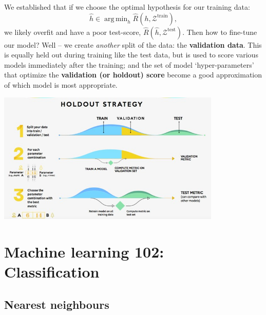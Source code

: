\documentclass{article}
\DeclareMathOperator*{\argmin}{arg\,min}
\begin{document}
\begin{spexample}
    We established that if we choose the optimal hypothesis for our training data:
    \begin{equation}
        \hat{h} \in \argmin_{h}\hat{R}(h,\mathcal{Z}^\text{train}),
    \end{equation}
    we likely overfit and have a poor test-score, $\hat{R}(\hat{h},\mathcal{Z}^\text{test})$. Then how to fine-tune our model? Well -- we create \textit{another} split of the data: the \textbf{validation data}. This is equally held out during training like the test data, but is used to score various models immediately after the training; and the set of model `hyper-parameters' that optimize the \textbf{validation (or holdout) score} become a good approximation of which model is most appropriate.\\
    \begin{center}\includegraphics[width=0.8\textwidth]{holdout-strategy.jpg}\end{center}
\end{spexample}

\newpage
\section{Machine learning 102: Classification}
\subsection{Nearest neighbours}
\end{document}
